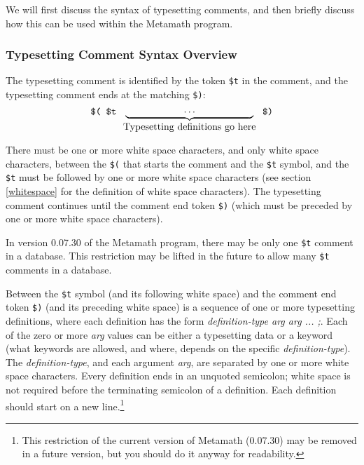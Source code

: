 We will first discuss the syntax of typesetting comments, and then
briefly discuss how this can be used within the Metamath program.

\subsubsection{Typesetting Comment Syntax Overview}

The typesetting comment is identified by the token
\texttt{\$t} in
the comment, and the typesetting comment ends at the matching
\texttt{\$)}:
\[
  \mbox{\tt \$(\ }
  \mbox{\tt \$t\ }
  \underbrace{
    \mbox{\tt \ \ \ \ \ \ \ \ \ \ \ }
    \cdots
    \mbox{\tt \ \ \ \ \ \ \ \ \ \ \ }
  }_{\mbox{Typesetting definitions go here}}
  \mbox{\tt \ \$)}
\]

There must be one or more white space characters, and only white space
characters, between the \texttt{\$(} that starts the comment
and the \texttt{\$t} symbol,
and the \texttt{\$t} must be followed by one
or more white space characters
(see section \ref{whitespace} for the definition of white space characters).
The typesetting comment continues until the comment end token \texttt{\$)}
(which must be preceded by one or more white space characters).

In version 0.07.30 of the
Metamath program, there may be only one \texttt{\$t} comment in a
database.  This restriction may be lifted in the future to allow
many \texttt{\$t} comments in a database.

Between the \texttt{\$t} symbol (and its following white space) and the
comment end token \texttt{\$)} (and its preceding white space)
is a sequence of one or more typesetting definitions, where
each definition has the form
\textit{definition-type arg arg ... ;}.
Each of the zero or more \textit{arg} values
can be either a typesetting data or a keyword
(what keywords are allowed, and where, depends on the specific
\textit{definition-type}).
The \textit{definition-type}, and each argument \textit{arg},
are separated by one or more white space characters.
Every definition ends in an unquoted semicolon;
white space is not required before the terminating semicolon of a definition.
Each definition should start on a new line.\footnote{This
restriction of the current version of Metamath
(0.07.30) may be removed
in a future version, but you should do it anyway for readability.} 

